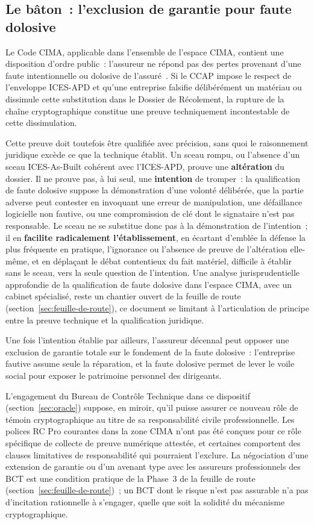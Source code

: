 \documentclass[11pt,a4paper]{article}
\begin{document}
\subsection{Le bâton~: l'exclusion de garantie pour faute dolosive}

Le Code CIMA, applicable dans l'ensemble de l'espace CIMA, contient une disposition d'ordre public~: l'assureur ne répond pas des pertes provenant d'une faute intentionnelle ou dolosive de l'assuré~\cite{cima2012}. Si le CCAP impose le respect de l'enveloppe ICES-APD et qu'une entreprise falsifie délibérément un matériau ou dissimule cette substitution dans le Dossier de Récolement, la rupture de la chaîne cryptographique constitue une preuve techniquement incontestable de cette dissimulation.

Cette preuve doit toutefois être qualifiée avec précision, sans quoi le raisonnement juridique excède ce que la technique établit. Un sceau rompu, ou l'absence d'un sceau ICES-As-Built cohérent avec l'ICES-APD, prouve une \textbf{altération} du dossier. Il ne prouve pas, à lui seul, une \textbf{intention} de tromper~: la qualification de faute dolosive suppose la démonstration d'une volonté délibérée, que la partie adverse peut contester en invoquant une erreur de manipulation, une défaillance logicielle non fautive, ou une compromission de clé dont le signataire n'est pas responsable. Le sceau ne se substitue donc pas à la démonstration de l'intention~; il en \textbf{facilite radicalement l'établissement}, en écartant d'emblée la défense la plus fréquente en pratique, l'ignorance ou l'absence de preuve de l'altération elle-même, et en déplaçant le débat contentieux du fait matériel, difficile à établir sans le sceau, vers la seule question de l'intention. Une analyse jurisprudentielle approfondie de la qualification de faute dolosive dans l'espace CIMA, avec un cabinet spécialisé, reste un chantier ouvert de la feuille de route (section~\ref{sec:feuille-de-route}), ce document se limitant à l'articulation de principe entre la preuve technique et la qualification juridique.

Une fois l'intention établie par ailleurs, l'assureur décennal peut opposer une exclusion de garantie totale sur le fondement de la faute dolosive~: l'entreprise fautive assume seule la réparation, et la faute dolosive permet de lever le voile social pour exposer le patrimoine personnel des dirigeants.

L'engagement du Bureau de Contrôle Technique dans ce dispositif (section~\ref{sec:oracle}) suppose, en miroir, qu'il puisse assurer ce nouveau rôle de témoin cryptographique au titre de sa responsabilité civile professionnelle. Les polices RC Pro courantes dans la zone CIMA n'ont pas été conçues pour ce rôle spécifique de collecte de preuve numérique attestée, et certaines comportent des clauses limitatives de responsabilité qui pourraient l'exclure. La négociation d'une extension de garantie ou d'un avenant type avec les assureurs professionnels des BCT est une condition pratique de la Phase~3 de la feuille de route (section~\ref{sec:feuille-de-route})~; un BCT dont le risque n'est pas assurable n'a pas d'incitation rationnelle à s'engager, quelle que soit la solidité du mécanisme cryptographique.
\end{document}
